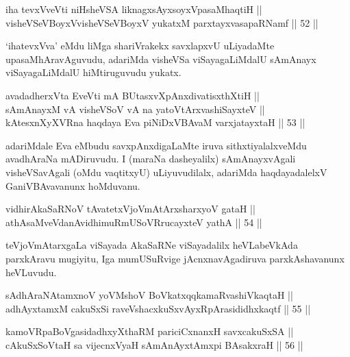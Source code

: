 \begin{shl}
iha tevxVveVti niHsheVSA liknagxsAyxsoyxVpasaMhaqtiH || \\
visheVSeVBoyxV\s visheVSeVBoyxV yukatxM parxtayxvasapaRNamf \hfill || 52 ||  
\end{shl}

\begin{artha}
`ihatevxVva' eMdu liMga shariVrakekx savxlapxvU uLiyadaMte
upasaMhAravAguvudu, adariMda visheVSa viSayagaLiMdalU sAmAnayx
viSayagaLiMdalU hiMtiruguvudu yukatx.
\end{artha}


\begin{shl}
avadadherxV\s ta EveVti mA BUtasxvXpAnxdivatisxthXtiH || \\
sAmAnayxM vA visheVSoV vA na yatoV\s tArxvashiSayxteV || \\
kAtesxnXyXVRna haqdaya Eva piNiDxVBAvaM varxjatayxtaH \hfill || 53 ||  
\end{shl}

\begin{artha}
adariMdale Eva eMbudu savxpAnxdigaLaMte iruva sithxtiyalalxveMdu
avadhAraNa mADiruvudu. I (maraNa dasheyalilx) sAmAnayxvAgali
visheVSavAgali (oMdu vaqtitxyU) uLiyuvudilalx, adariMda haqdayadalelxV
GaniVBAvavanunx hoMduvanu.
\end{artha}


\begin{shl}
vidhirAkaSaRNoV tAvatetxVjoVmAtArxsharxyoV gataH || \\
athAsaMveVdanAvidhimuRmUSoVRrucayxteV yathA \hfill || 54 ||  
\end{shl}

\begin{artha}
teVjoVmAtarxgaLa viSayada AkaSaRNe viSayadalilx heVLabeVkAda
parxkAravu mugiyitu, Iga mumUSuRvige jAcnxnavAgadiruva parxkAshavanunx heVLuvudu.
\end{artha}


\begin{shl}
sAdhAraNAtamxnoV yoVM\s shoV BoVkatxqqkamaRvashiVkaqtaH || \\
adhAyxtamxM cakuSxSi raveVshacxkuSxvAyxRpArasididhxkaqtf \hfill || 55 ||  
\end{shl}

\begin{shl}
kamoVRpaBoVgasidadhxyXthaRM pariciCxnanxH savxcakuSxSA || \\
\footnotemark[1]cAkuSxSoV\s taH sa vijecnxVyaH sAmAnAyxtAmx\s pi BAsakxraH \hfill || 56 ||  
\end{shl}

